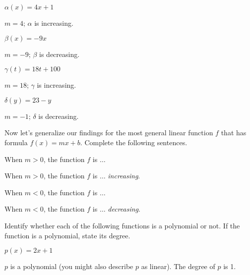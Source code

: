 \begin{exercises}
\begin{problem}
\begin{multicols}{4}
\begin{subproblem}
		$\alpha(x)=4x+1$ 
		\begin{shortsolution}
			$m=4$; $\alpha$ is increasing. 
		\end{shortsolution}
	\end{subproblem}
	\begin{subproblem}
		$\beta(x)=-9x$ 
		\begin{shortsolution}
			$m=-9$; $\beta$ is decreasing. 
		\end{shortsolution}
	\end{subproblem}
	\begin{subproblem}
		$\gamma(t)=18t+100$ 
		\begin{shortsolution}
			$m=18$; $\gamma$ is increasing.
		\end{shortsolution}
	\end{subproblem}
	\begin{subproblem}
		$\delta(y)=23-y$ 
		\begin{shortsolution}
			$m=-1$; $\delta$ is decreasing. 
		\end{shortsolution}
	\end{subproblem}
\end{multicols}
Now let's generalize our findings for the most general linear function $f$
that has formula $f(x)=mx+b$. Complete the following sentences.
\begin{subproblem}
	When $m>0$, the function $f$ is $\ldots$  
	\begin{shortsolution}
		When $m>0$, the function $f$ is $\ldots$  \emph{increasing}.
	\end{shortsolution}
\end{subproblem}
\begin{subproblem}
	When $m<0$, the function $f$ is $\ldots$  
	\begin{shortsolution}
		When $m<0$, the function $f$ is $\ldots$  \emph{decreasing}.
	\end{shortsolution}
\end{subproblem}
\end{problem}
\begin{problem}
Identify whether each of the following functions is a polynomial or not. 
If the function is a polynomial, state its degree.
\begin{multicols}{3}
	\begin{subproblem}
		$p(x)=2x+1$
		\begin{shortsolution}
			$p$ is a polynomial (you might also describe $p$ as linear). The degree of $p$ is 1.

\end{shortsolution}
\end{subproblem}
\end{multicols}
\end{problem}
\end{exercises}
